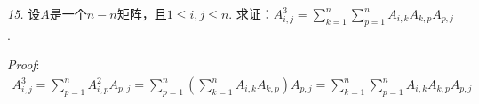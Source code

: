 \hspace*{\fill}

\textit{15.}
设\(A\)是一个\(n-n\)矩阵，且\(1 \leq i,j \leq n\).
求证：\(A^3_{i,j}=\sum_{k=1}^n \sum_{p=1}^n A_{i,k}A_{k,p}A_{p,j}\).

\textit{Proof}:
    \begin{align*}
        A^3_{i,j}=\sum_{p=1}^n A^2_{i,p}A_{p,j}
        =\sum_{p=1}^n (\sum_{k=1}^n A_{i,k}A_{k,p})A_{p,j}
        =\sum_{k=1}^n \sum_{p=1}^n A_{i,k}A_{k,p}A_{p,j}
    \end{align*}